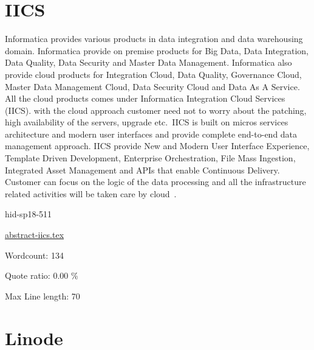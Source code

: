 \section{IICS}

Informatica provides various products in data integration and data
warehousing domain. Informatica provide on premise products for Big
Data, Data Integration, Data Quality, Data Security and Master Data
Management. Informatica also provide cloud products for Integration
Cloud, Data Quality, Governance Cloud, Master Data Management Cloud,
Data Security Cloud and Data As A Service. All the cloud products
comes under Informatica Integration Cloud Services (IICS).
with the cloud approach customer need not to worry about the patching,
high availability of the servers, upgrade etc.\ IICS is
built on micros services architecture and modern user interfaces and
provide complete end-to-end data management approach. IICS
provide New and Modern User Interface Experience, Template Driven
Development, Enterprise Orchestration, File Mass Ingestion, Integrated
Asset Management and APIs that enable Continuous Delivery. Customer
can focus on the logic of the data processing and all the
infrastructure related activities will be taken care by
cloud~\cite{hid-sp18-511-iics}.
 
 


\begin{IU}

hid-sp18-511

\href{https://github.com/cloudmesh-community/hid-sp18-511/blob/master//technology/abstract-iics.tex}{abstract-iics.tex}

 

Wordcount: 134


Quote ratio: 0.00 \%
 
Max Line length: 70
\end{IU}

\section{Linode}

